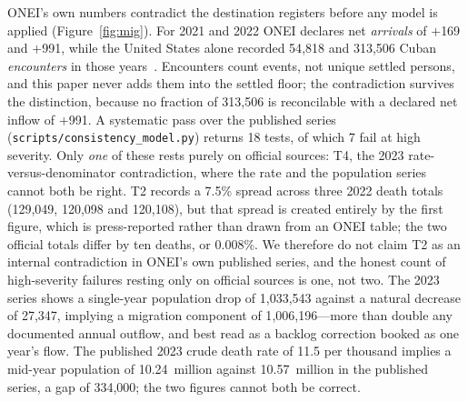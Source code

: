 \documentclass[11pt,a4paper]{article}
\begin{document}
ONEI's own numbers contradict the destination registers before any model is applied (Figure~\ref{fig:mig}).
For 2021 and 2022 ONEI declares net \emph{arrivals} of $+$169 and $+$991, while the United States alone recorded 54{,}818 and 313{,}506 Cuban \emph{encounters} in those years~\citep{cbp_encounters}. Encounters count events, not unique settled persons, and this paper never adds them into the settled floor; the contradiction survives the distinction, because no fraction of 313{,}506 is reconcilable with a declared net inflow of $+$991.
A systematic pass over the published series (\texttt{scripts/consistency\_model.py}) returns 18 tests, of which 7 fail at high severity. Only \emph{one} of these rests purely on official sources: T4, the 2023 rate-versus-denominator contradiction, where the rate and the population series cannot both be right. T2 records a 7.5\% spread across three 2022 death totals (129{,}049, 120{,}098 and 120{,}108), but that spread is created entirely by the first figure, which is press-reported rather than drawn from an ONEI table; the two official totals differ by ten deaths, or 0.008\%. We therefore do not claim T2 as an internal contradiction in ONEI's own published series, and the honest count of high-severity failures resting only on official sources is one, not two.
The 2023 series shows a single-year population drop of 1{,}033{,}543 against a natural decrease of 27{,}347, implying a migration component of 1{,}006{,}196---more than double any documented annual outflow, and best read as a backlog correction booked as one year's flow.
The published 2023 crude death rate of 11.5 per thousand implies a mid-year population of 10.24~million against 10.57~million in the published series, a gap of 334{,}000; the two figures cannot both be correct.
\end{document}
